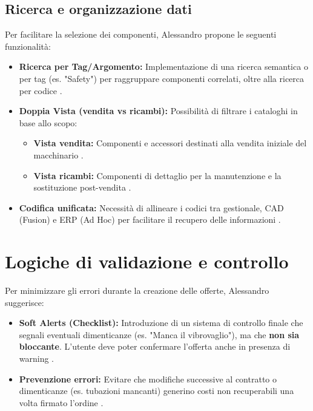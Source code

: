 \documentclass[12pt, a4paper]{article} %
\begin{document}
\subsection{Ricerca e organizzazione dati}
Per facilitare la selezione dei componenti, Alessandro propone le seguenti funzionalità:
\begin{itemize}
      \item \textbf{Ricerca per Tag/Argomento:} Implementazione di una ricerca semantica o per tag (es. "Safety") per raggruppare componenti correlati, oltre alla ricerca per codice .
      \item \textbf{Doppia Vista (vendita vs ricambi):} Possibilità di filtrare i cataloghi in base allo scopo:
            \begin{itemize}
                  \item \textbf{Vista vendita:} Componenti e accessori destinati alla vendita iniziale del macchinario .
                  \item \textbf{Vista ricambi:} Componenti di dettaglio per la manutenzione e la sostituzione post-vendita .
            \end{itemize}
      \item \textbf{Codifica unificata:} Necessità di allineare i codici tra gestionale, CAD (Fusion) e ERP (Ad Hoc) per facilitare il recupero delle informazioni .
\end{itemize} 

\section{Logiche di validazione e controllo}
Per minimizzare gli errori durante la creazione delle offerte, Alessandro suggerisce:
\begin{itemize}
      \item \textbf{Soft Alerts (Checklist):} Introduzione di un sistema di controllo finale che segnali eventuali dimenticanze (es. "Manca il vibrovaglio"), ma che \textbf{non sia bloccante}.
            L'utente deve poter confermare l'offerta anche in presenza di warning .
      \item \textbf{Prevenzione errori:} Evitare che modifiche successive al contratto o dimenticanze (es. tubazioni mancanti) generino costi non recuperabili una volta firmato l'ordine .
\end{itemize}
\end{document}

